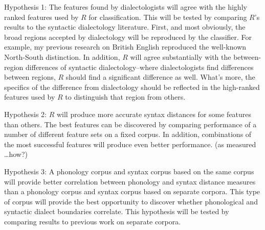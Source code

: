 \documentclass[11pt,letterpaper]{article}
\begin{document}
Hypothesis 1: The features found by dialectologists will agree with
the highly ranked features used by $R$ for classification.  This will
be tested by comparing $R$'s results to the syntactic dialectology
literature. First, and most obviously, the broad regions accepted by
dialectology will be reproduced by the classifier. For example, my
previous research on British English reproduced the well-known
North-South distinction. In addition, $R$ will agree substantially with the
between-region differences of syntactic dialectology--where
dialectologists find differences between regions, $R$ should find a
significant difference as well. What's more, the specifics of the
difference from dialectology should be reflected in the high-ranked
features used by $R$ to distinguish that region from others.

Hypothesis 2: $R$ will produce more accurate syntax distances for some
features than others. The best features can be discovered by
comparing performance of a number of different feature sets on a fixed
corpus. In addition, combinations of the most successful features will
produce even better performance. (as measured \ldots how?)

Hypothesis 3: A phonology corpus and syntax corpus based on the same
corpus will provide better correlation between phonology and syntax
distance measures than a phonology corpus and syntax corpus based on
separate corpora. This type of corpus will provide the best
opportunity to discover whether phonological and syntactic dialect
boundaries correlate. This hypothesis will be tested by comparing results to
previous work on separate corpora.



\end{document}
